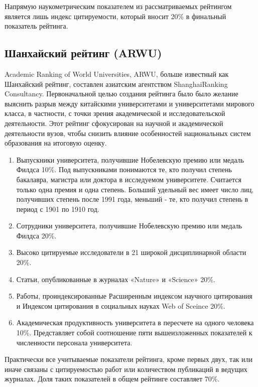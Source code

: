 Напрямую наукометрическим показателем из рассматриваемых рейтингом является лишь
индекс цитируемости, который вносит 20\% в финальный показатель рейтинга.

\subsection{Шанхайский рейтинг (ARWU)}

Academic Ranking of World Universities, ARWU, больше известный как Шанхайский рейтинг,
составлен азиатским агентством ShanghaiRanking Consultancy.
Первоначальной целью создания рейтинга было было желание выяснить разрыв
между китайскими университетами и университетами мирового класса, в частности,
с точки зрения академической и исследовательской деятельности.
Этот рейтинг сфокусирован на научной и академической деятельности вузов,
чтобы снизить влияние особенностей национальных систем образования на итоговую оценку.

\begin{enumerate}
  \item Выпускники университета, получившие Нобелевскую премию или медаль Филдса 10\%.
  Под выпускниками понимаются те, кто получил степень бакалавра, магистра или доктора
  в исследуемом университете. Считается только одна премия и одна степень.
  Больший удельный вес имеет число лиц, получивших степень после 1991 года,
  меньший - те, кто получил степень в период с 1901 по 1910 год.
  \item Сотрудники университета, получившие Нобелевскую премию или медаль Филдса 20\%.
  \item Высоко цитируемые исследователи в 21 широкой дисциплинарной области 20\%.
  \item Статьи, опубликованные в журналах «Nature» и «Science» 20\%.
  \item Работы, проиндексированные Расширенным индексом научного цитирования и
  Индексом цитирования в социальных науках Web of Sceince 20\%.
  \item Академическая продуктивность университета в пересчете на одного человека 10\%.
  Представляет собой соотношение пяти вышеизложенных показателей к численности персонала университета.
\end{enumerate}

Практически все учитываемые показатели рейтинга, кроме первых двух, так или иначе
связаны с цитируемостью работ или количеством публикаций в ведущих журналах.
Доля таких показателей в общем рейтинге составляет 70\%.

